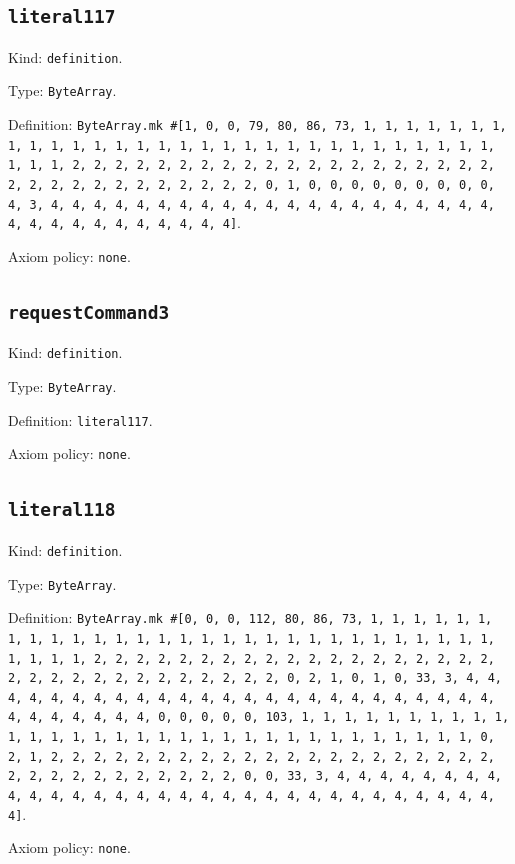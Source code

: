 \documentclass[11pt]{article}
\begin{document}
\subsection*{\texttt{literal117}}
\noindent Kind: \texttt{definition}.\par
\noindent Type: \texttt{ByteArray}.\par
\noindent Definition: \texttt{ByteArray.mk \#[1, 0, 0, 79, 80, 86, 73, 1, 1, 1, 1, 1, 1, 1, 1, 1, 1, 1, 1, 1, 1, 1, 1, 1, 1, 1, 1, 1, 1, 1, 1, 1, 1, 1, 1, 1, 1, 1, 1, 1, 2, 2, 2, 2, 2, 2, 2, 2, 2, 2, 2, 2, 2, 2, 2, 2, 2, 2, 2, 2, 2, 2, 2, 2, 2, 2, 2, 2, 2, 2, 2, 2, 0, 1, 0, 0, 0, 0, 0, 0, 0, 0, 0, 4, 3, 4, 4, 4, 4, 4, 4, 4, 4, 4, 4, 4, 4, 4, 4, 4, 4, 4, 4, 4, 4, 4, 4, 4, 4, 4, 4, 4, 4, 4, 4, 4, 4]}.\par
\noindent Axiom policy: \texttt{none}.\par
\subsection*{\texttt{requestCommand3}}
\noindent Kind: \texttt{definition}.\par
\noindent Type: \texttt{ByteArray}.\par
\noindent Definition: \texttt{literal117}.\par
\noindent Axiom policy: \texttt{none}.\par
\subsection*{\texttt{literal118}}
\noindent Kind: \texttt{definition}.\par
\noindent Type: \texttt{ByteArray}.\par
\noindent Definition: \texttt{ByteArray.mk \#[0, 0, 0, 112, 80, 86, 73, 1, 1, 1, 1, 1, 1, 1, 1, 1, 1, 1, 1, 1, 1, 1, 1, 1, 1, 1, 1, 1, 1, 1, 1, 1, 1, 1, 1, 1, 1, 1, 1, 1, 2, 2, 2, 2, 2, 2, 2, 2, 2, 2, 2, 2, 2, 2, 2, 2, 2, 2, 2, 2, 2, 2, 2, 2, 2, 2, 2, 2, 2, 2, 2, 2, 0, 2, 1, 0, 1, 0, 33, 3, 4, 4, 4, 4, 4, 4, 4, 4, 4, 4, 4, 4, 4, 4, 4, 4, 4, 4, 4, 4, 4, 4, 4, 4, 4, 4, 4, 4, 4, 4, 4, 4, 0, 0, 0, 0, 0, 103, 1, 1, 1, 1, 1, 1, 1, 1, 1, 1, 1, 1, 1, 1, 1, 1, 1, 1, 1, 1, 1, 1, 1, 1, 1, 1, 1, 1, 1, 1, 1, 1, 0, 2, 1, 2, 2, 2, 2, 2, 2, 2, 2, 2, 2, 2, 2, 2, 2, 2, 2, 2, 2, 2, 2, 2, 2, 2, 2, 2, 2, 2, 2, 2, 2, 2, 2, 0, 0, 33, 3, 4, 4, 4, 4, 4, 4, 4, 4, 4, 4, 4, 4, 4, 4, 4, 4, 4, 4, 4, 4, 4, 4, 4, 4, 4, 4, 4, 4, 4, 4, 4, 4]}.\par
\noindent Axiom policy: \texttt{none}.\par
\end{document}
